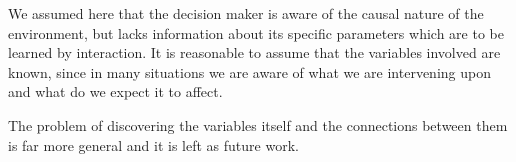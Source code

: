 \documentclass{article}
\begin{document}
We assumed here that the decision maker is aware of the causal nature of the environment, but lacks information about its specific parameters which are to be learned by interaction. It is reasonable to assume that the variables involved are known, since in many situations we are aware of what we are intervening upon and what do we expect it to affect. 

The problem of discovering the variables itself and the connections between them is far more general and it is left as future work.



\end{document}

